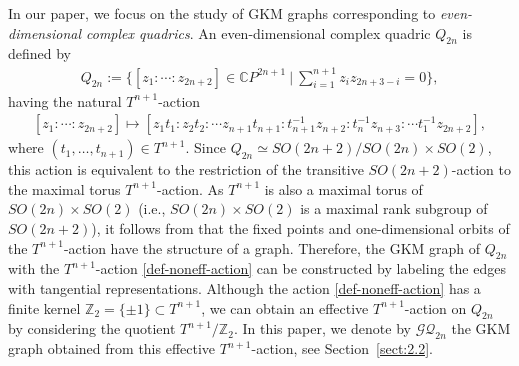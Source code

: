 \documentclass[12pt]{amsart}
\theoremstyle{remark}
\numberwithin{equation}{section}
\begin{document}
In our paper, we focus on the study of GKM graphs corresponding to {\it even-dimensional complex quadrics}.
An even-dimensional complex quadric $Q_{2n}$ is defined by 
\begin{align*}
Q_{2n}:= \{[z_{1}:\cdots :z_{2n+2}]\in \mathbb{C}P^{2n+1}\ |\ \sum_{i=1}^{n+1}z_{i}z_{2n+3-i}=0\},
\end{align*}
having the natural $T^{n+1}$-action
\begin{align}
\label{def-noneff-action}
[z_{1}:\cdots :z_{2n+2}]\mapsto [z_{1}t_{1}: z_{2}t_{2}: \cdots z_{n+1}t_{n+1}: t_{n+1}^{-1}z_{n+2}: t_{n}^{-1}z_{n+3}: \cdots t_{1}^{-1}z_{2n+2}],
\end{align}
where $(t_{1},\ldots, t_{n+1})\in T^{n+1}$.
Since $Q_{2n}\simeq SO(2n+2)/SO(2n)\times SO(2)$, this action is equivalent to 
the restriction of the transitive $SO(2n+2)$-action to the maximal torus $T^{n+1}$-action.
As $T^{n+1}$ is also a maximal torus of $SO(2n)\times SO(2)$ (i.e., $SO(2n)\times SO(2)$ is a maximal rank subgroup of $SO(2n+2)$), it follows from \cite{GHZ} that the fixed points and one-dimensional orbits of the $T^{n+1}$-action have the structure of a graph.
Therefore, the GKM graph of $Q_{2n}$ with the $T^{n+1}$-action \eqref{def-noneff-action} can be constructed by labeling the edges with tangential representations.
Although the action \eqref{def-noneff-action} has a finite kernel $\mathbb{Z}_{2}=\{\pm 1\}\subset T^{n+1}$, 
we can obtain an effective $T^{n+1}$-action on $Q_{2n}$ by considering the quotient $T^{n+1}/\mathbb{Z}_{2}$.
In this paper, we denote by $\mathcal{GQ}_{2n}$ the GKM graph obtained from this effective $T^{n+1}$-action, see Section~\ref{sect:2.2}.
\end{document}
